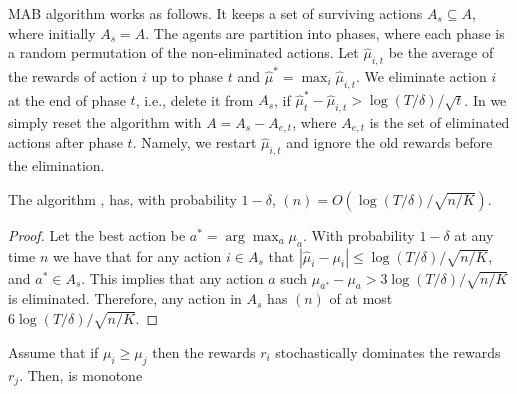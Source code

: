 


MAB algorithm \SuccesiveEliminationReset works as follows. It keeps
a set of surviving actions $A_s\subseteq A$, where initially
$A_s=A$. The agents are partition into phases, where each phase is a
random permutation of the non-eliminated actions.
Let $\hat{\mu}_{i,t}$ be the average of the rewards of action $i$ up
to phase $t$ and $\hat{\mu}^*=\max_i \hat{\mu}_{i,t}$. We eliminate
action $i$ at the end of phase $t$, i.e., delete it from $A_s$, if
$\hat{\mu}_t^*-\hat{\mu}_{i,t} > \log(T/\delta)/\sqrt{t}$.
In \SuccesiveEliminationReset we simply reset the algorithm with
$A=A_s-A_{e,t}$, where $A_{e,t}$ is the set of eliminated actions
after phase $t$. Namely, we restart $\hat{\mu}_{i,t}$ and ignore the
old rewards before the elimination.

\begin{lemma}
%
The algorithm \SuccesiveEliminationReset, has, with probability
$1-\delta$, \BIR$(n)=O(\log(T/\delta)/\sqrt{n/K})$.
\end{lemma}

\begin{proof}
Let the best action be $a^*=\arg\max_a \mu_a$. With probability
$1-\delta$ at any time $n$ we have that for any action $i\in A_s$
that $|\hat{\mu}_i -\mu_i|\leq \log(T/\delta)/\sqrt{n/K}$, and
$a^*\in A_s$. This implies that any action $a$ such
$\mu_{a^*}-\mu_{a}> 3\log(T/\delta)/\sqrt{n/K}$ is eliminated.
Therefore, any action in $A_s$ has \BIR$(n)$ of at most
$6\log(T/\delta)/\sqrt{n/K}$.
\end{proof}

\begin{lemma}
Assume that if $\mu_i\geq \mu_j$ then the rewards $r_i$
stochastically dominates the rewards $r_j$.
%
Then, \SuccesiveEliminationReset is monotone
\end{lemma}

